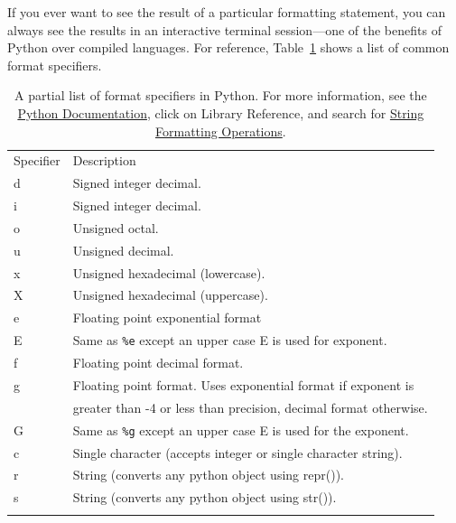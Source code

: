 If you ever want to see the result of a particular formatting statement, you can always see the results in an interactive terminal session---one of the benefits of Python over compiled languages. For reference,  Table~\ref{tab:FormatSpecifiers} shows a list of common format specifiers.
\begin{table}
\centering
\caption{A partial list of format specifiers in Python. For more information, see the \href{http://docs.python.org/}{Python Documentation}, click on Library
Reference, and search for \href{http://docs.python.org/lib/typesseq-strings.html}{String Formatting Operations}. }
\label{tab:FormatSpecifiers}       %
\begin{tabular}{ll}
\hline\noalign{\smallskip}
Specifier\hspace*{7mm} & Description  \\
\noalign{\smallskip}\hline\noalign{\smallskip}
d&	Signed integer decimal.	\\
i&	Signed integer decimal.	\\
o&	Unsigned octal.\\
u&	Unsigned decimal.\\	
x&	Unsigned hexadecimal (lowercase).\\
X&	Unsigned hexadecimal (uppercase).\\
e&	Floating point exponential format \\
E&  Same as \verb!%e! except an upper case E is used for exponent.\\
f&	Floating point decimal format.\\
g&	Floating point format. Uses exponential format if exponent is\\
 & greater than -4 or less than precision, decimal format otherwise.\\
G&  Same as \verb!%g! except an upper case E is used for the exponent.\\
c&	Single character (accepts integer or single character string).	\\
r&	String (converts any python object using repr()).	\\
s&	String (converts any python object using str()).\\
\noalign{\smallskip}\hline
\end{tabular}
\end{table}
%

